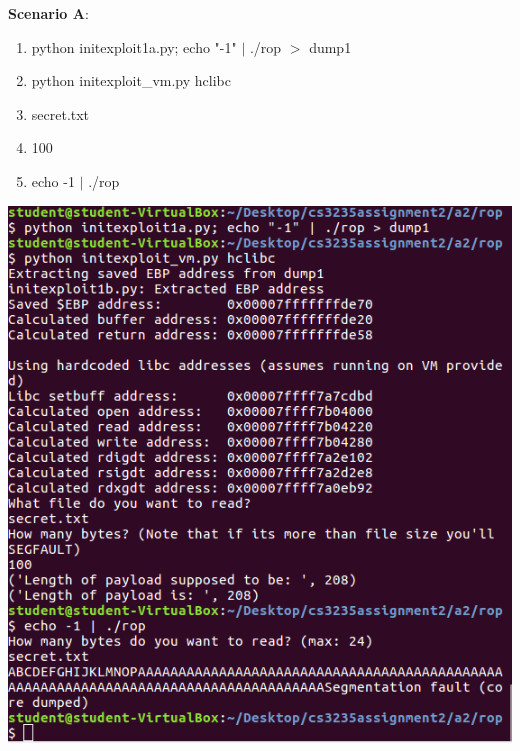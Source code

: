\documentclass[12pt]{article}
\begin{document}
\newpage
\textbf{Scenario A}:
\begin{enumerate}
    \item python initexploit1a.py; echo "-1" $|$ ./rop $>$ dump1
    \item python initexploit\_vm.py hclibc
    \item secret.txt
    \item 100
    \item echo -1 $|$ ./rop
\end{enumerate}
\includegraphics[scale=1]{./a2/rop/sceA.PNG}
\end{document}
